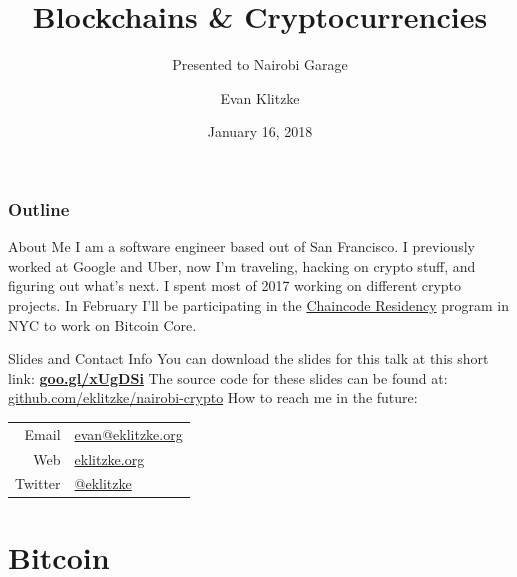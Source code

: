 \documentclass[14pt]{beamer}
\title{Blockchains \& Cryptocurrencies}
\subtitle{Presented to Nairobi Garage}
\author{Evan Klitzke}
\date{January 16, 2018}
\begin{document}
\begin{frame}
  \titlepage
\end{frame}


\begin{frame}
\frametitle{Outline}
  \tableofcontents
\end{frame}

\begin{frame}{About Me}
  I am a software engineer based out of San Francisco. I previously worked at
  Google and Uber, now I'm traveling, hacking on crypto stuff, and figuring out
  what's next.
  \newline
  \newline
  I spent most of 2017 working on different crypto projects. In February I'll be
  participating in the \href{https://hackerresidency.com}{Chaincode Residency}
  program in NYC to work on Bitcoin Core.
\end{frame}

\begin{frame}{Slides and Contact Info}
  You can download the slides for this talk at this short link:
  \textbf{\href{https://goo.gl/xUgDSi}{goo.gl/xUgDSi}}
  \newline
  \newline
  The source code for these slides can be found at:
  \href{https://github.com/eklitzke/nairobi-crypto}{github.com/eklitzke/nairobi-crypto}
  \newline
  \newline
  How to reach me in the future:
  \newline
  \newline
  \begin{tabular}{r | l}
    Email & \href{mailto:evan@eklitzke.org}{evan@eklitzke.org} \\
    Web & \href{https://eklitzke.org}{eklitzke.org} \\
    Twitter & \href{https://twitter.com/eklitzke}{@eklitzke} \\
  \end{tabular}
\end{frame}

\section{Bitcoin}
\end{document}
